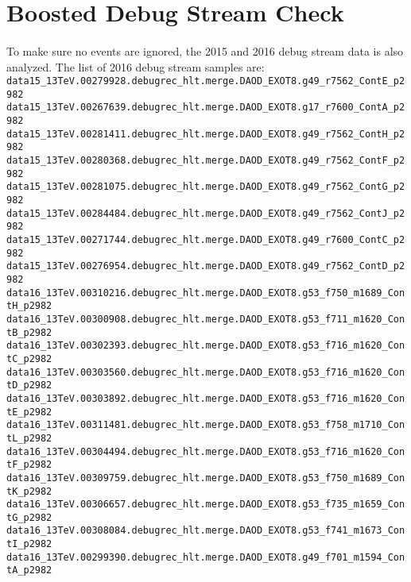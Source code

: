 \section{Boosted Debug Stream Check} %
\label{app:boosted-debug-stream}
\paragraph{}
To make sure no events are ignored, the 2015 and 2016 debug stream data is also analyzed. The list of 2016 debug stream samples are:
\noindent
\\
{\scriptsize
\verb|data15_13TeV.00279928.debugrec_hlt.merge.DAOD_EXOT8.g49_r7562_ContE_p2982|\\
\verb|data15_13TeV.00267639.debugrec_hlt.merge.DAOD_EXOT8.g17_r7600_ContA_p2982|\\
\verb|data15_13TeV.00281411.debugrec_hlt.merge.DAOD_EXOT8.g49_r7562_ContH_p2982|\\
\verb|data15_13TeV.00280368.debugrec_hlt.merge.DAOD_EXOT8.g49_r7562_ContF_p2982|\\
\verb|data15_13TeV.00281075.debugrec_hlt.merge.DAOD_EXOT8.g49_r7562_ContG_p2982|\\
\verb|data15_13TeV.00284484.debugrec_hlt.merge.DAOD_EXOT8.g49_r7562_ContJ_p2982|\\
\verb|data15_13TeV.00271744.debugrec_hlt.merge.DAOD_EXOT8.g49_r7600_ContC_p2982|\\
\verb|data15_13TeV.00276954.debugrec_hlt.merge.DAOD_EXOT8.g49_r7562_ContD_p2982|\\
\verb|data16_13TeV.00310216.debugrec_hlt.merge.DAOD_EXOT8.g53_f750_m1689_ContH_p2982|\\
\verb|data16_13TeV.00300908.debugrec_hlt.merge.DAOD_EXOT8.g53_f711_m1620_ContB_p2982|\\
\verb|data16_13TeV.00302393.debugrec_hlt.merge.DAOD_EXOT8.g53_f716_m1620_ContC_p2982|\\
\verb|data16_13TeV.00303560.debugrec_hlt.merge.DAOD_EXOT8.g53_f716_m1620_ContD_p2982|\\
\verb|data16_13TeV.00303892.debugrec_hlt.merge.DAOD_EXOT8.g53_f716_m1620_ContE_p2982|\\
\verb|data16_13TeV.00311481.debugrec_hlt.merge.DAOD_EXOT8.g53_f758_m1710_ContL_p2982|\\
\verb|data16_13TeV.00304494.debugrec_hlt.merge.DAOD_EXOT8.g53_f716_m1620_ContF_p2982|\\
\verb|data16_13TeV.00309759.debugrec_hlt.merge.DAOD_EXOT8.g53_f750_m1689_ContK_p2982|\\
\verb|data16_13TeV.00306657.debugrec_hlt.merge.DAOD_EXOT8.g53_f735_m1659_ContG_p2982|\\
\verb|data16_13TeV.00308084.debugrec_hlt.merge.DAOD_EXOT8.g53_f741_m1673_ContI_p2982|\\
\verb|data16_13TeV.00299390.debugrec_hlt.merge.DAOD_EXOT8.g49_f701_m1594_ContA_p2982|
}

